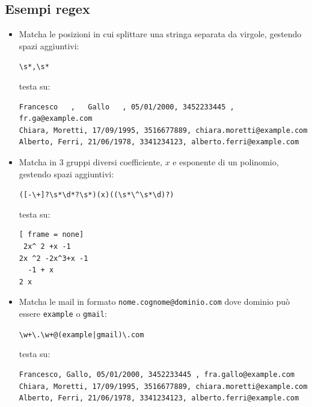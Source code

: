 \subsection{Esempi regex}
\begin{itemize}
	\item Matcha le posizioni in cui splittare una stringa separata da virgole, gestendo spazi aggiuntivi:
	      \begin{center}
		      \verb|\s*,\s*|
	      \end{center}

	      testa su:

	      \begin{lstlisting}[frame = none]
Francesco   ,   Gallo   , 05/01/2000, 3452233445 , fr.ga@example.com
Chiara, Moretti, 17/09/1995, 3516677889, chiara.moretti@example.com
Alberto, Ferri, 21/06/1978, 3341234123, alberto.ferri@example.com 
          \end{lstlisting}
	\item Matcha in 3 gruppi diversi coefficiente, $ x $ e esponente di un polinomio, gestendo spazi aggiuntivi:
	      \begin{center}
		      \verb|([-\+]?\s*\d*?\s*)(x)((\s*\^\s*\d)?)|
	      \end{center}
	      testa su:
	      \begin{lstlisting}[ frame = none]
 2x^ 2 +x -1
2x ^2 -2x^3+x -1
  -1 + x
2 x
          \end{lstlisting}
	\item Matcha le mail in formato \verb|nome.cognome@dominio.com| dove dominio può essere \verb|example| o \verb|gmail|:
	      \begin{center}
		      \verb|\w+\.\w+@(example|\texttt{|}\verb|gmail)\.com|
	      \end{center}
	      testa su:

	      \begin{lstlisting}[frame = none]
Francesco, Gallo, 05/01/2000, 3452233445 , fra.gallo@example.com
Chiara, Moretti, 17/09/1995, 3516677889, chiara.moretti@example.com
Alberto, Ferri, 21/06/1978, 3341234123, alberto.ferri@example.com 
          \end{lstlisting}
\end{itemize}


